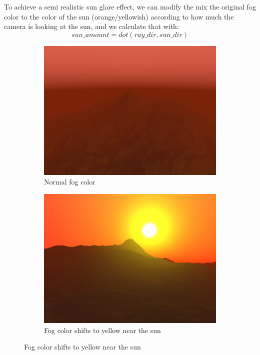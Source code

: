 \documentclass[a4paper,10pt]{article} %
\begin{document}
To achieve a semi realistic sun glare effect, we can modify the mix the original fog color to the color of the sun (orange/yellowish) according 
to how much the camera is looking at the sun, and we calculate that with:
\[
    sun\_amount = dot(ray\_dir, sun\_dir)
\]

\begin{figure}[ht]
  \centering
  \begin{subfigure}[h]{0.5\linewidth}
    \includegraphics[width=0.95\linewidth]{fog}
    \caption{Normal fog color}
  \end{subfigure}%
  \begin{subfigure}[h]{0.5\linewidth}
    \includegraphics[width=0.95\linewidth]{fogsun}
    \caption{Fog color shifts to yellow near the sun}
  \end{subfigure}
\end{figure}
\end{document}
